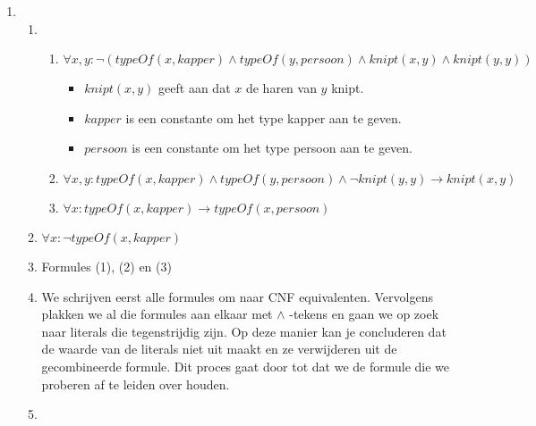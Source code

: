 \documentclass[]{article}
\begin{document}
  \begin{enumerate}[a]
    \item
    \begin{enumerate}[i]
      \item
      \begin{enumerate}[1]
        \item $  \forall x, y: \lnot (typeOf(x, kapper) \land typeOf(y,persoon) \land knipt(x,y) \land knipt(y,y)) $
        \begin{itemize}
          \item $knipt(x,y)$ geeft aan dat $x$ de haren van $y$ knipt.
          \item $kapper$ is een constante om het type kapper aan te geven.
          \item $persoon$ is een constante om het type persoon aan te geven.
        \end{itemize}
        \item $ \forall x, y: typeOf(x, kapper) \land typeOf(y, persoon) \land \lnot knipt(y, y) \longrightarrow knipt(x, y) $
        \item $ \forall x: typeOf(x, kapper) \longrightarrow typeOf(x, persoon)$
      \end{enumerate}
      \item $\forall x: \neg typeOf(x,kapper)$
      \item Formules (1), (2) en (3)
      \item We schrijven eerst alle formules om naar CNF equivalenten. Vervolgens plakken we al die formules aan elkaar met $\land$ -tekens en
      gaan we op zoek naar literals die tegenstrijdig zijn. Op deze manier kan je concluderen dat de waarde van de literals niet uit maakt en ze verwijderen
      uit de gecombineerde formule. Dit proces gaat door tot dat we de formule die we proberen af te leiden over houden.
      \item
      \begin{enumerate}[1]

\end{enumerate}
\end{enumerate}
\end{enumerate}
\end{document}
